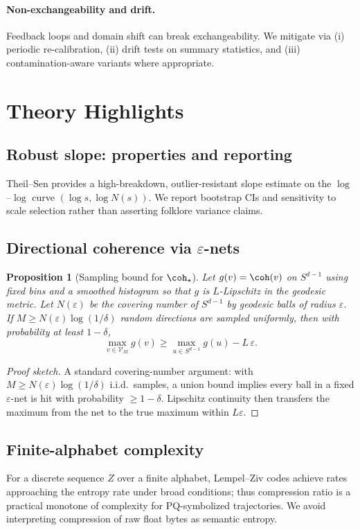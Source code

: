 \documentclass[11pt]{article}
\newtheorem{proposition}{Proposition}
\begin{document}
\paragraph{Non-exchangeability and drift.} Feedback loops and domain shift can break exchangeability. We mitigate via (i) periodic re-calibration, (ii) drift tests on summary statistics, and (iii) contamination-aware variants where appropriate.

\section{Theory Highlights}
\subsection{Robust slope: properties and reporting}
Theil--Sen provides a high-breakdown, outlier-resistant slope estimate on the $\log$--$\log$ curve $(\log s,\log N(s))$. We report bootstrap CIs and sensitivity to scale selection rather than asserting folklore variance claims.

\subsection{Directional coherence via $\varepsilon$-nets}
\begin{proposition}[Sampling bound for $\coh_\star$]\label{prop:coh}
Let $g(v)=\coh(v)$ on $S^{d-1}$ using fixed bins and a smoothed histogram so that $g$ is $L$-Lipschitz in the geodesic metric. Let $N(\varepsilon)$ be the covering number of $S^{d-1}$ by geodesic balls of radius $\varepsilon$. If $M\ge N(\varepsilon)\log(1/\delta)$ random directions are sampled uniformly, then with probability at least $1-\delta$,
\[
\max_{v\in\mathcal{V}_M} g(v) \ge \max_{u\in S^{d-1}} g(u) - L\,\varepsilon.
\]
\end{proposition}
\begin{proof}[Proof sketch]
A standard covering-number argument: with $M\ge N(\varepsilon)\log(1/\delta)$ i.i.d.\ samples, a union bound implies every ball in a fixed $\varepsilon$-net is hit with probability $\ge 1-\delta$. Lipschitz continuity then transfers the maximum from the net to the true maximum within $L\varepsilon$.
\end{proof}

\subsection{Finite-alphabet complexity}
For a discrete sequence $Z$ over a finite alphabet, Lempel--Ziv codes achieve rates approaching the entropy rate under broad conditions; thus compression ratio is a practical monotone of complexity for PQ-symbolized trajectories. We avoid interpreting compression of raw float bytes as semantic entropy.
\end{document}

